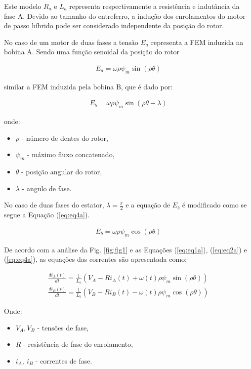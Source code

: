 Este modelo $R_a$ e $L_a$ representa respectivamente a resistência e indutância da fase A. Devido ao tamanho do entreferro, a indução dos enrolamentos do motor de passo híbrido pode ser considerado independente da posição do rotor. 

No caso de um motor de duas fases a tensão $E_a$ representa a FEM induzida na bobina A. Sendo uma função senoidal da posição do rotor

\begin{eqnarray}
	\label{eq:eq2a}
	E_a = \omega \rho \psi_m \sin(\rho \theta)
\end{eqnarray}

similar a FEM induzida pela bobina B, que é dado por:

\begin{eqnarray}
		\label{eq:eq3a}
		E_b = \omega \rho \psi_m \sin(\rho \theta - \lambda)
\end{eqnarray}

onde:

\begin{itemize}
	\item $\rho$ - número de dentes do rotor,
	\item $\psi_m$ - máximo fluxo concatenado, 	\item $\theta$ - posição angular do rotor,
	\item $\lambda$ - angulo de fase.
\end{itemize}

No caso de duas fases do estator, $\lambda = \frac{\pi}{2}$ e a equação de $E_b$ é modificado como se segue a Equação (\ref{eq:eq4a}).

\begin{eqnarray}
		\label{eq:eq4a}
		E_b = \omega \rho \psi_m \cos(\rho \theta )
\end{eqnarray}

De acordo com a análise da Fig. \ref{fig:fig1} e as Equações (\ref{eq:eq1a}), (\ref{eq:eq2a}) e (\ref{eq:eq4a}), as equações das correntes são apresentada como:

\begin{eqnarray}
	\label{eq:eq5a}
	\frac{d i_A(t)}{dt} = \frac{1}{L_a}\left(V_A - Ri_A(t) + \omega(t) \rho \psi_m \sin(\rho \theta) \right) \\
	\label{eq:eq5b}
	\frac{d i_B(t)}{dt} = \frac{1}{L_b}\left(V_B - Ri_B(t) - \omega(t) \rho \psi_m \cos(\rho \theta) \right) 
\end{eqnarray}

Onde:

\begin{itemize}
	\item $V_A, V_B$ - tensões de fase,
	\item $R$ - resistência de fase do enrolamento,
	\item $i_A,\ i_B$ - correntes de fase.
\end{itemize}

